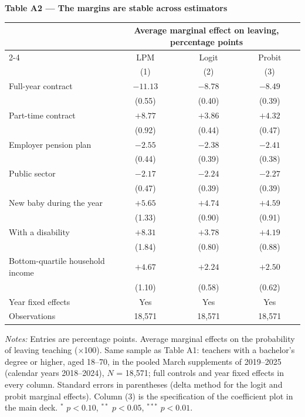 \documentclass[11pt]{article}
\newcommand{\sym}[1]{\rlap{$^{#1}$}}
\begin{document}
\clearpage

\begin{center}
{\large\bfseries Table A2 --- The margins are stable across
estimators}\\[1.0em]
\begin{threeparttable}
\begin{tabular}{lccc}
\toprule
 & \multicolumn{3}{c}{Average marginal effect on leaving, percentage points} \\
\cmidrule(lr){2-4}
 & LPM & Logit & Probit \\
 & (1) & (2) & (3) \\
\midrule
Full-year contract & $-11.13$\sym{***} & $-8.78$\sym{***} & $-8.49$\sym{***} \\
 & (0.55) & (0.40) & (0.39) \\[0.2em]
Part-time contract & $+8.77$\sym{***} & $+3.86$\sym{***} & $+4.32$\sym{***} \\
 & (0.92) & (0.44) & (0.47) \\[0.2em]
Employer pension plan & $-2.55$\sym{***} & $-2.38$\sym{***} & $-2.41$\sym{***} \\
 & (0.44) & (0.39) & (0.38) \\[0.2em]
Public sector & $-2.17$\sym{***} & $-2.24$\sym{***} & $-2.27$\sym{***} \\
 & (0.47) & (0.39) & (0.39) \\[0.2em]
New baby during the year & $+5.65$\sym{***} & $+4.74$\sym{***} & $+4.59$\sym{***} \\
 & (1.33) & (0.90) & (0.91) \\[0.2em]
With a disability & $+8.31$\sym{***} & $+3.78$\sym{***} & $+4.19$\sym{***} \\
 & (1.84) & (0.80) & (0.88) \\[0.2em]
Bottom-quartile household income & $+4.67$\sym{***} & $+2.24$\sym{***} & $+2.50$\sym{***} \\
 & (1.10) & (0.58) & (0.62) \\
\midrule
Year fixed effects & Yes & Yes & Yes \\
Observations       & 18,571 & 18,571 & 18,571 \\
\bottomrule
\end{tabular}
\begin{tablenotes}[flushleft]
\footnotesize
\item \emph{Notes:} Entries are percentage points. Average marginal
effects on the probability of
leaving teaching ($\times$100). Same sample as Table A1: teachers with
a bachelor's degree or higher, aged 18--70, in the pooled March
supplements of 2019--2025 (calendar years 2018--2024), $N$ = 18,571;
full controls and year fixed effects in every column. Standard errors
in parentheses (delta method for the logit and probit marginal
effects). Column (3) is the specification of the coefficient plot in
the main deck. $^{*}$ $p<0.10$, $^{**}$ $p<0.05$, $^{***}$ $p<0.01$.
\end{tablenotes}
\end{threeparttable}
\end{center}
\end{document}
